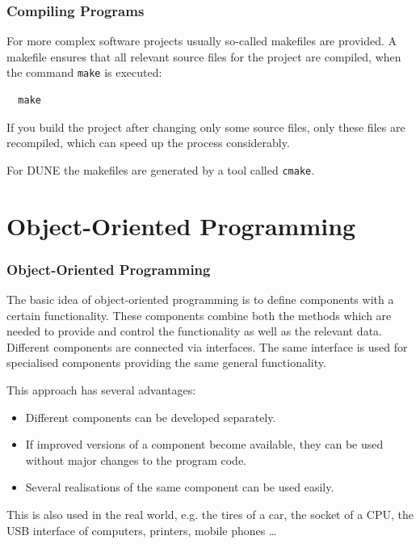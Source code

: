 \documentclass[aspectratio=169,ignorenonframetext,11pt]{beamer}
\def\inline{\lstinline[basicstyle=\small\ttfamily]}
\begin{document}
\begin{frame}[fragile]
  \frametitle<presentation>{Compiling Programs}
  For more complex software projects usually so-called makefiles are provided. A makefile ensures that all relevant source files for the project are compiled, when the command \inline!make! is executed:
  \begin{lstlisting}
  make
  \end{lstlisting}
  If you build the project after changing only some source files, only these files are recompiled, which can speed up the process considerably.
  
  For DUNE the makefiles are generated by a tool called \inline!cmake!.
\end{frame}

\section{Object-Oriented Programming}

\begin{frame}
\frametitle<presentation>{Object-Oriented Programming}
The basic idea of object-oriented programming is to define components with a certain functionality. These components combine both the methods which are needed to provide and control the functionality as well as the relevant data. Different components are connected via interfaces. The same interface is used for specialised components providing the same general functionality.

This approach has several advantages:
\begin{itemize}
\item Different components can be developed separately.
\item If improved versions of a component become available, they can be used without major changes to the program code.
\item Several realisations of the same component can be used easily.
\end{itemize}

This is also used in the real world, e.g. the tires of a car, the socket of a CPU, the USB interface of computers, printers, mobile phones \dots
\end{frame}
\end{document}
